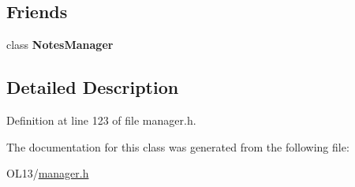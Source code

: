 \subsection*{Friends}
\begin{DoxyCompactItemize}
\item 
\mbox{\label{class_notes_manager_1_1_iterator_a017a5144e8cfa6087305055ab968ef41}} 
class {\bfseries Notes\+Manager}
\end{DoxyCompactItemize}


\subsection{Detailed Description}


Definition at line 123 of file manager.\+h.



The documentation for this class was generated from the following file\+:\begin{DoxyCompactItemize}
\item 
O\+L13/\hyperlink{manager_8h}{manager.\+h}\end{DoxyCompactItemize}

